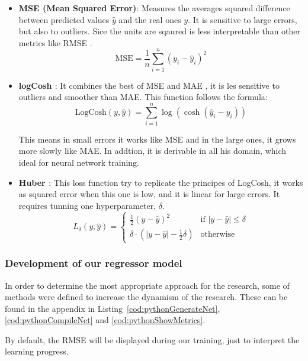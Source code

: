 \begin{itemize}
    \item \textbf{MSE \cite{tensorflow-mse} (Mean Squared Error)}: Measures the averages squared difference between predicted values \(\hat{y}\) and the real ones \(y\). It is sensitive to large errors, but also to outliers. Sice the units are sqaured is less interpretable than other metrics like RMSE \cite{tensorflow-rmse}.
    \[
    \text{MSE} = \frac{1}{n} \sum_{i=1}^{n} (y_i - \hat{y}_i)^2
    \]

    \item \textbf{logCosh \cite{tensorflow-logcosh}}: It combines the best of MSE and MAE \cite{tensorflow-mae}, it is les sensitive to outliers and smoother than MAE. This function follows the formula:
    \[
    \text{LogCosh}(y, \hat{y}) = \sum_{i=1}^{n} \log\left( \cosh(\hat{y}_i - y_i) \right)
    \]

    This means in small errors it works like MSE and in the large ones, it grows more slowly like MAE. In addtion, it is derivable in all his domain, which ideal for neural network training.

    \item \textbf{Huber \cite{tensorflow-huber}}: This loss function try to replicate the principes of LogCosh, it works as squared error when this one is low, and it is linear for large errors. It requires tunning one hyperparameter, \(\delta\).
    \[
    L_{\delta}(y, \hat{y}) =
    \begin{cases}
    \frac{1}{2}(y - \hat{y})^2 & \text{if } |y - \hat{y}| \leq \delta \\
    \delta \cdot (|y - \hat{y}| - \frac{1}{2} \delta) & \text{otherwise}
    \end{cases}
    \]

\end{itemize}

\subsubsection{Development of our regressor model}

In order to determine the most appropriate approach for the research, some of methods were defined to increase the dynamism of the research. These can be found in the appendix in Listing~\ref{cod:pythonGenerateNet}, \ref{cod:pythonCompileNet} and \ref{cod:pythonShowMetrics}.


By default, the RMSE will be displayed during our training, just to interpret the learning progress.

